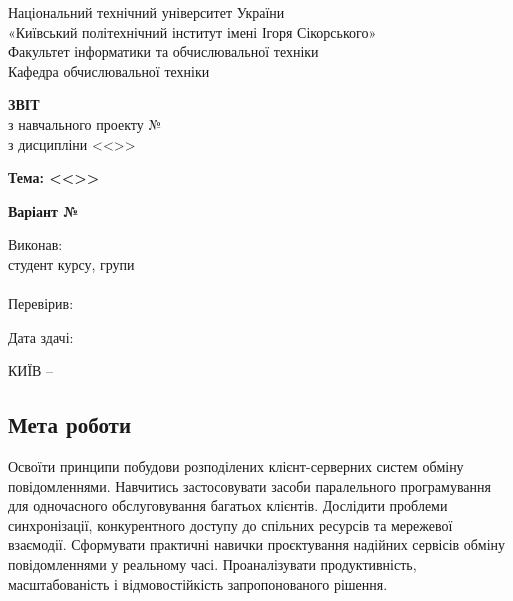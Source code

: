 \documentclass[14pt, a4paper]{extreport}
\begin{document}
	
	\begin{titlepage}
		\begin{center}
			\normalsize
			Національний технічний університет України\\
			«Київський політехнічний інститут імені Ігоря Сікорського» \\[0.5em]
			Факультет інформатики та обчислювальної техніки\\
			Кафедра обчислювальної техніки
			
			\vfill
			
			{\large \textbf{ЗВІТ}\\[0.5em]}
			{з навчального проекту №\LabNumber \\}
			{з дисципліни <<\CourseTitle>>}
			
			\vspace{2em}
			
			{\textbf{Тема: <<\Topic>>}}
			
			\vspace{1em}
			
			{\textbf{Варіант №\Variant}}
			
			\vfill
			
			\begin{flushright}
				Виконав: \\ студент \CourseNumber{} курсу, групи \StudentGroup \\
				\StudentName \\[1em]
				Перевірив: \\ \Teacher
			\end{flushright}
			
			\vfill
			
			\begin{flushright}
				Дата здачі: \DTMtoday
			\end{flushright}
			
			\vspace{5em}
			КИЇВ -- \ReportYear
		\end{center}
	\end{titlepage}
	
	\clearpage
	\setcounter{page}{2}
	
	\subsection*{Мета роботи} 
	
	Освоїти принципи побудови розподілених клієнт-серверних систем обміну повідомленнями. Навчитись застосовувати засоби паралельного програмування для одночасного обслуговування багатьох клієнтів. Дослідити проблеми синхронізації, конкурентного доступу до спільних ресурсів та мережевої взаємодії. Сформувати практичні навички проєктування надійних сервісів обміну повідомленнями у реальному часі. Проаналізувати продуктивність, масштабованість і відмовостійкість запропонованого рішення.
	
\end{document}
